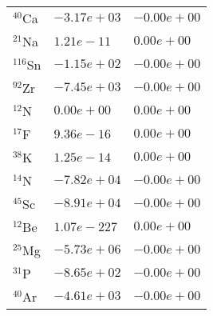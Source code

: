 \begin{tabular}{lll}
 $^{40}$Ca  & $-3.17e+03 $                                                       & $-0.00e+00 $                                                                    \\
 $^{21}$Na  & $1.21e-11 $                                                        & $0.00e+00 $                                                                     \\
 $^{116}$Sn & $-1.15e+02 $                                                       & $-0.00e+00 $                                                                    \\
 $^{92}$Zr  & $-7.45e+03 $                                                       & $-0.00e+00 $                                                                    \\
 $^{12}$N   & $0.00e+00 $                                                        & $0.00e+00 $                                                                     \\
 $^{17}$F   & $9.36e-16 $                                                        & $0.00e+00 $                                                                     \\
 $^{38}$K   & $1.25e-14 $                                                        & $0.00e+00 $                                                                     \\
 $^{14}$N   & $-7.82e+04 $                                                       & $-0.00e+00 $                                                                    \\
 $^{45}$Sc  & $-8.91e+04 $                                                       & $-0.00e+00 $                                                                    \\
 $^{12}$Be  & $1.07e-227 $                                                       & $0.00e+00 $                                                                     \\
 $^{25}$Mg  & $-5.73e+06 $                                                       & $-0.00e+00 $                                                                    \\
 $^{31}$P   & $-8.65e+02 $                                                       & $-0.00e+00 $                                                                    \\
 $^{40}$Ar  & $-4.61e+03 $                                                       & $-0.00e+00 $                                                                    \\

\end{tabular}
